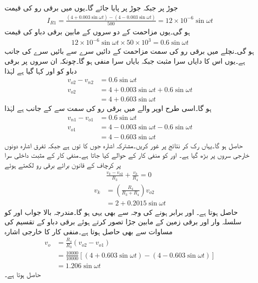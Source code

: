 جوڑ  پر  جبکہ جوڑ  پر  پایا جائے گا۔یوں  میں برقی رو کی قیمت
\begin{align*}
I_{R1}=\frac{\left(4+0.003 \sin \omega t \right)-\left(4-0.003 \sin \omega t \right)}{500}=12 \times 10^{-6} \sin \omega t
\end{align*}
 ہو گی۔یوں مزاحمت  کے دو سروں کے مابین برقی دباو  کی قیمت
\begin{align*}
12 \times 10^{-6} \sin \omega t \times 50 \times 10^3=0.6 \sin \omega t
\end{align*}
ہو گی۔نچلے  میں برقی رو کی سمت مزاحمت کے دائیں سرے سے بائیں سرے کی جانب ہے۔یوں اس کا دایاں سرا مثبت جبکہ بایاں سرا منفی ہو گا۔چونکہ ان سروں پر برقی دباو کو  اور  کہا گیا ہے لہٰذا
\begin{align*}
v_{o2}-v_{n2}&=0.6 \sin \omega t\\
v_{o2}&=4+0.003 \sin \omega t +0.6 \sin \omega t\\
&=4+0.603 \sin \omega t
\end{align*}
ہو گا۔اسی طرح اوپر والے  میں برقی رو کی سمت  سے  کے جانب ہے لہٰذا
\begin{align*}
v_{n1}-v_{o1}&=0.6 \sin \omega t\\
v_{o1}&=4-0.003 \sin \omega t -0.6 \sin \omega t\\
&=4-0.603 \sin \omega t
\end{align*}
حاصل ہو گا۔یہاں رک کر نتائج پر غور کریں۔مشترکہ اشارہ جوں کا توں ہے جبکہ تفرق اشارہ دونوں خارجی سروں  پر  بڑھ گیا ہے۔ اور  کو منفی کار کے حوالے کیا جاتا ہے۔منفی کار  کے مثبت داخلی سرا  پر کرچاف کے قانون برائے برقی رو لکھتے ہوئے
\begin{align*}
&\frac{v_k-v_{o2}}{R_3}+\frac{v_k}{R_4}=0\\
v_k&=\left(\frac{R_4}{R_3+R_4} \right) v_{o2}\\
&=2+0.2015 \sin \omega t
\end{align*}
حاصل ہوتا ہے۔ اور  برابر ہونے کی وجہ سے  بھی یہی ہو گا۔مندرجہ بالا جواب  اور  کو سلسلہ وار  اور برقی زمین کے مابین جڑا تصور کرتے ہوئے برقی دباو کے تقسیم کی مساوات سے بھی حاصل ہوتا ہے۔منفی کار کا خارجی اشارہ
\begin{align*}
v_o&=\frac{R_4}{R_3}{\left(v_{o2}-v_{o1} \right)}\\
&=\frac{10000}{10000} \left[\left(4+0.603 \sin \omega t\right)-\left(4-0.603 \sin \omega t \right) \right]\\
&=1.206 \sin \omega t
\end{align*}
حاصل ہوتا ہے۔

